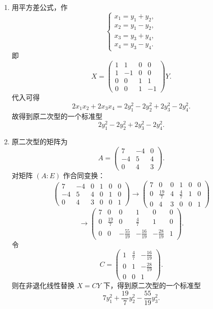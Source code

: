 \begin{solution}
	\begin{enumerate}
		\item 用平方差公式，作
		\[
		\begin{cases}
			x_1=y_1+y_2,\\
			x_2=y_1-y_2,\\
			x_3=y_3+y_4,\\
			x_4=y_3-y_4.
		\end{cases}
		\]
		即
		\[
		X=\begin{pmatrix}
			1&1&0&0\\
			1&-1&0&0\\
			0&0&1&1\\
			0&0&1&-1
		\end{pmatrix}Y.
		\]
		代入可得
		\[
		2x_1x_2+2x_3x_4
		=2y_1^2-2y_2^2+2y_3^2-2y_4^2.
		\]
		故得到原二次型的一个标准型
		\[
		2y_1^2-2y_2^2+2y_3^2-2y_4^2.
		\]
		
		\item 原二次型的矩阵为
		\[
		A=\begin{pmatrix}
			7&-4&0\\
			-4&5&4\\
			0&4&3
		\end{pmatrix}.
		\]
		对矩阵 $(A:E)$ 作合同变换：
		\[
		\left(\begin{array}{ccc|ccc}
			7&-4&0&1&0&0\\
			-4&5&4&0&1&0\\
			0&4&3&0&0&1
		\end{array}\right)
		\longrightarrow
		\left(\begin{array}{ccc|ccc}
			7&0&0&1&0&0\\
			0&\frac{19}{7}&4&\frac47&1&0\\
			0&4&3&0&0&1
		\end{array}\right)
		\]
		\[
		\longrightarrow
		\left(\begin{array}{ccc|ccc}
			7&0&0&1&0&0\\
			0&\frac{19}{7}&0&\frac47&1&0\\
			0&0&-\frac{55}{19}&-\frac{16}{19}&-\frac{28}{19}&1
		\end{array}\right).
		\]
		令
		\[
		C=\begin{pmatrix}
			1&\frac47&-\frac{16}{19}\\
			0&1&-\frac{28}{19}\\
			0&0&1
		\end{pmatrix}.
		\]
		则在非退化线性替换 $X=CY$ 下，得到原二次型的一个标准型
		\[
		7y_1^2+\frac{19}{7}y_2^2-\frac{55}{19}y_3^2.
		\]
	\end{enumerate}
\end{solution}

